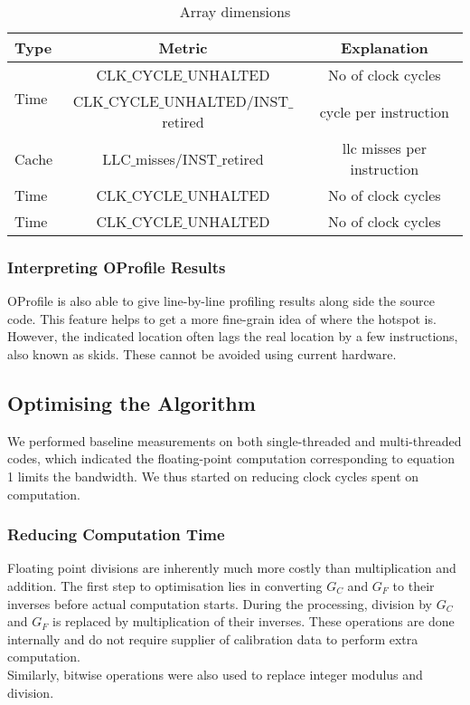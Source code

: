 \documentclass[journal]{IEEEtran}
\begin{document}
\begin{table*}[ht]

\label{Operf_metrics}
\centering
\begin{tabular}{l c c}
\hline
Type 					& Metric & Explanation\\
\hline\hline

\multirow{2}{*}{Time}
& CLK$\_$CYCLE$\_$UNHALTED & No of clock cycles	\\ 
& CLK$\_$CYCLE$\_$UNHALTED/INST$\_$retired & cycle per instruction	\\

\hline

\multirow{1}{*}{Cache}
& LLC$\_$misses/INST$\_$retired & llc misses per instruction	\\
\hline

\multirow{1}{*}{Time}
& CLK$\_$CYCLE$\_$UNHALTED & No of clock cycles	\\
\hline

\multirow{1}{*}{Time}
& CLK$\_$CYCLE$\_$UNHALTED & No of clock cycles	\\
\hline


\end{tabular}
\caption{Array dimensions}
\end{table*}

\subsubsection{Interpreting OProfile Results}
OProfile is also able to give line-by-line profiling results along side the source code. This feature helps to get a more fine-grain idea of where the hotspot is. However, the indicated location often lags the real location by a few instructions, also known as skids. These cannot be avoided using current hardware.

\subsection{Optimising the Algorithm}
We performed baseline measurements on both single-threaded and multi-threaded codes, which indicated the floating-point computation corresponding to equation 1 limits the bandwidth. We thus started on reducing clock cycles spent on computation.
\subsubsection{Reducing Computation Time}
Floating point divisions are inherently much more costly than multiplication and addition. The first step to optimisation lies in converting $G_C$ and $G_F$ to their inverses before actual computation starts. During the processing, division by $G_C$ and $G_F$ is replaced by multiplication of their inverses. These operations are done internally and do not require supplier of calibration data to perform extra computation.\\
Similarly, bitwise operations were also used to replace integer modulus and division.\\
\end{document}

